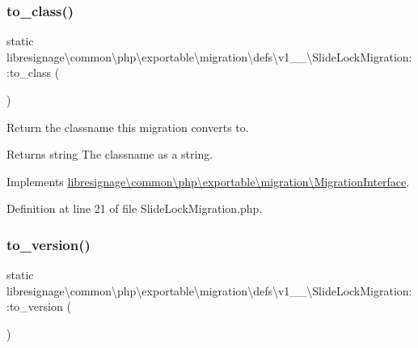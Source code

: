 \subsubsection{\texorpdfstring{to\+\_\+class()}{to\_class()}}
{\footnotesize\ttfamily static libresignage\textbackslash{}common\textbackslash{}php\textbackslash{}exportable\textbackslash{}migration\textbackslash{}defs\textbackslash{}v1\+\_\+\_\textbackslash{}\+Slide\+Lock\+Migration\+::to\+\_\+class (\begin{DoxyParamCaption}{ }\end{DoxyParamCaption})\hspace{0.3cm}{\ttfamily [static]}}

Return the classname this migration converts to.

\begin{DoxyReturn}{Returns}
string The classname as a string. 
\end{DoxyReturn}


Implements \hyperlink{interfacelibresignage_1_1common_1_1php_1_1exportable_1_1migration_1_1MigrationInterface_ab1f33cdd8684595d6b000bcbc7c4d5a4}{libresignage\textbackslash{}common\textbackslash{}php\textbackslash{}exportable\textbackslash{}migration\textbackslash{}\+Migration\+Interface}.



Definition at line 21 of file Slide\+Lock\+Migration.\+php.

\mbox{\label{classlibresignage_1_1common_1_1php_1_1exportable_1_1migration_1_1defs_1_1v1__0__0_1_1SlideLockMigration_aca4a9060c5f5bf8ad2ca301ec6c1079f}} 
\subsubsection{\texorpdfstring{to\+\_\+version()}{to\_version()}}
{\footnotesize\ttfamily static libresignage\textbackslash{}common\textbackslash{}php\textbackslash{}exportable\textbackslash{}migration\textbackslash{}defs\textbackslash{}v1\+\_\+\_\textbackslash{}\+Slide\+Lock\+Migration\+::to\+\_\+version (\begin{DoxyParamCaption}{ }\end{DoxyParamCaption})\hspace{0.3cm}{\ttfamily [static]}}

